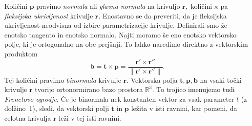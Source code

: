\documentclass[12pt,a4paper,twoside]{article}
\theoremstyle{definition} %
\theoremstyle{plain} %
\theoremstyle{primerstyle}
\numberwithin{equation}{section}  %
\newcommand{\R}{\mathbb R}
\newcommand{\tV}{\mathbf{t}}
\newcommand{\bV}{\mathbf{b}}
\newcommand{\pV}{\mathbf{p}}
\newcommand{\rV}{\mathbf{r}}
\begin{document}
Količini $\pV$ pravimo \textit{normala} ali \textit{glavna normala} na krivuljo $\rV,$ količini $\kappa$ pa \textit{fleksijska ukrivljenost} krivulje $\rV.$ Enostavno se da preveriti, da je fleksijska ukrivljenost neodvisna od izbire parametrizacije krivulje.
Definirali smo že enotsko tangento in enotsko normalo. Najti moramo še eno enotsko vektorsko polje, ki je ortogonalno na obe prejšnji. To lahko naredimo direktno z vektorskim produktom
\begin{equation}
	\label{binormala}
	\bV=\tV \times \pV=\frac{\rV'\times \rV''}{\lVert \rV'\times \rV'' \rVert}.
\end{equation}
Tej količini pravimo \textit{binormala} krivulje $\rV.$ Vektorska polja $\tV,\mathbf{ p}, \mathbf{ b}$ na vsaki točki krivulje $\rV$ tvorijo ortonormirano bazo prostora $\R^3.$ To trojico imenujemo tudi \textit{Frenetovo ogrodje}. Če je binormala nek konstanten vektor za vsak parameter $t$ (z dolžino~1), sledi, da vektorski polji $\tV$ in $\pV$ ležita v isti ravnini, kar pomeni, da celotna krivulja $\rV$ leži v tej isti ravnini.
\end{document}
